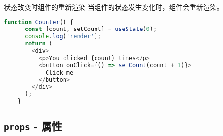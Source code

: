 \documentclass{beamer}
\begin{document}
\begin{frame}
  \begin{alertblock}{状态改变时组件的重新渲染}
    当组件的状态发生变化时，组件会重新渲染。
  \end{alertblock}

  \begin{lstlisting}[language=JavaScript]
    function Counter() {
      const [count, setCount] = useState(0);
      console.log('render');
      return (
        <div>
          <p>You clicked {count} times</p>
          <button onClick={() => setCount(count + 1)}>
            Click me
          </button>
        </div>
      );
    }
  \end{lstlisting}

\end{frame}

\subsection{\texttt{props} - 属性}
\end{document}
